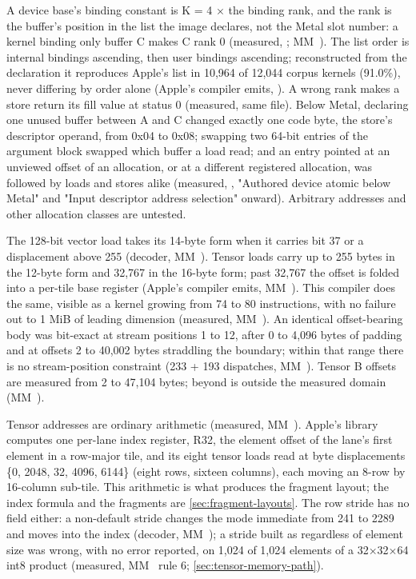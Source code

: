 A device base's binding constant is K = 4 × the binding rank, and the rank is the buffer's
position in the list the image declares, not the Metal slot number: a kernel binding only buffer C makes C rank 0
(measured, ; MM~). The list order is internal bindings ascending, then user bindings ascending;
reconstructed from the declaration it reproduces Apple's list in 10,964 of 12,044 corpus kernels (91.0\%), never
differing by order alone (Apple's compiler emits, ). A wrong rank makes a store return its fill
value at status 0 (measured, same file). Below Metal, declaring one unused buffer between A and C changed exactly one
code byte, the store's descriptor operand, from 0x04 to 0x08; swapping two 64-bit entries of the argument block
swapped which buffer a load read; and an entry pointed at an unviewed offset of an allocation, or at a different
registered allocation, was followed by loads and stores alike (measured, ,
"Authored device atomic below Metal" and "Input descriptor address selection" onward). Arbitrary addresses and other
allocation classes are untested.

The 128-bit vector load takes its 14-byte form when it carries bit 37 or a
displacement above 255 (decoder, MM~). Tensor loads carry up to 255 bytes in the 12-byte form and 32,767 in the
16-byte form; past 32,767 the offset is folded into a per-tile base register (Apple's compiler emits, MM~).
This compiler does the same, visible as a kernel growing from 74 to 80 instructions, with no failure out to 1 MiB of
leading dimension (measured, MM~). An identical offset-bearing body was bit-exact at stream positions 1 to 12,
after 0 to 4,096 bytes of padding and at offsets 2 to 40,002 bytes straddling the boundary; within that range there is no
stream-position constraint (233 + 193 dispatches, MM~). Tensor B offsets are measured from 2 to 47,104
bytes; beyond is outside the measured domain (MM~).

Tensor addresses are ordinary arithmetic (measured, MM~). Apple's library computes one per-lane index register,
R32, the element offset of the lane's first element in a row-major tile, and its eight tensor loads read
\code{[R32*2 + disp]} at byte displacements \{0, 2048, 32, 4096, 6144\} (eight rows, sixteen columns), each moving an 8-row
by 16-column sub-tile. This arithmetic is what produces the fragment layout; the index formula and the fragments are
\cref{sec:fragment-layouts}. The row stride has no field either: a non-default stride changes the mode immediate from 241 to 2289
and moves into the index (decoder, MM~); a stride built as  regardless of element size was wrong, with no
error reported, on 1,024 of 1,024 elements of a 32×32×64 int8 product (measured, MM~ rule 6; \cref{sec:tensor-memory-path}).

